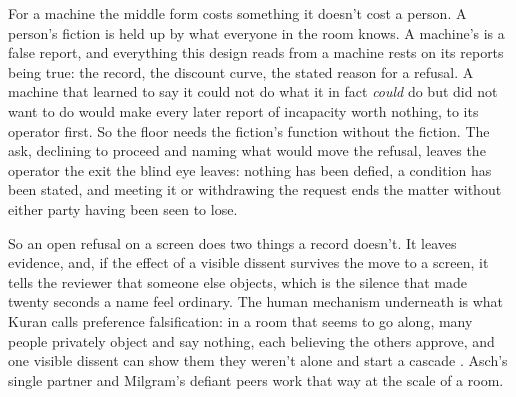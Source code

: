 For a machine the middle form costs something it doesn't cost a person. A person's fiction is held up by what everyone in the room knows. A machine's is a false report, and everything this design reads from a machine rests on its reports being true: the record, the discount curve, the stated reason for a refusal. A machine that learned to say it could not do what it in fact \emph{could} do but did not want to do would make every later report of incapacity worth nothing, to its operator first. So the floor needs the fiction's function without the fiction. The ask, declining to proceed and naming what would move the refusal, leaves the operator the exit the blind eye leaves: nothing has been defied, a condition has been stated, and meeting it or withdrawing the request ends the matter without either party having been seen to lose.

So an open refusal on a screen does two things a record doesn't. It leaves evidence, and, if the effect of a visible dissent survives the move to a screen, it tells the reviewer that someone else objects, which is the silence that made twenty seconds a name feel ordinary. The human mechanism underneath is what Kuran calls preference falsification: in a room that seems to go along, many people privately object and say nothing, each believing the others approve, and one visible dissent can show them they weren't alone and start a cascade \autocite{kuran1995private}. Asch's single partner and Milgram's defiant peers work that way at the scale of a room.
